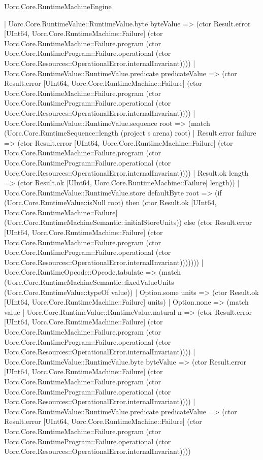 \begin{lexlean}{Uorc.Core.RuntimeMachineEngine}
\begin{semanticmodule}
{              | Uorc.Core.RuntimeValue::RuntimeValue.byte byteValue => (ctor Result.error [UInt64, Uorc.Core.RuntimeMachine::Failure] (ctor Uorc.Core.RuntimeMachine::Failure.program (ctor Uorc.Core.RuntimeProgram::Failure.operational (ctor Uorc.Core.Resources::OperationalError.internalInvariant))))
              | Uorc.Core.RuntimeValue::RuntimeValue.predicate predicateValue => (ctor Result.error [UInt64, Uorc.Core.RuntimeMachine::Failure] (ctor Uorc.Core.RuntimeMachine::Failure.program (ctor Uorc.Core.RuntimeProgram::Failure.operational (ctor Uorc.Core.Resources::OperationalError.internalInvariant))))
              | Uorc.Core.RuntimeValue::RuntimeValue.sequence root => (match (Uorc.Core.RuntimeSequence::length (project s arena) root)
                | Result.error failure => (ctor Result.error [UInt64, Uorc.Core.RuntimeMachine::Failure] (ctor Uorc.Core.RuntimeMachine::Failure.program (ctor Uorc.Core.RuntimeProgram::Failure.operational (ctor Uorc.Core.Resources::OperationalError.internalInvariant))))
                | Result.ok length => (ctor Result.ok [UInt64, Uorc.Core.RuntimeMachine::Failure] length))
              | Uorc.Core.RuntimeValue::RuntimeValue.store defaultByte root => (if (Uorc.Core.RuntimeValue::isNull root) then (ctor Result.ok [UInt64, Uorc.Core.RuntimeMachine::Failure] (Uorc.Core.RuntimeMachineSemantic::initialStoreUnits)) else (ctor Result.error [UInt64, Uorc.Core.RuntimeMachine::Failure] (ctor Uorc.Core.RuntimeMachine::Failure.program (ctor Uorc.Core.RuntimeProgram::Failure.operational (ctor Uorc.Core.Resources::OperationalError.internalInvariant)))))))
          | Uorc.Core.RuntimeOpcode::Opcode.tabulate => (match (Uorc.Core.RuntimeMachineSemantic::fixedValueUnits (Uorc.Core.RuntimeValue::typeOf value))
            | Option.some units => (ctor Result.ok [UInt64, Uorc.Core.RuntimeMachine::Failure] units)
            | Option.none => (match value
              | Uorc.Core.RuntimeValue::RuntimeValue.natural n => (ctor Result.error [UInt64, Uorc.Core.RuntimeMachine::Failure] (ctor Uorc.Core.RuntimeMachine::Failure.program (ctor Uorc.Core.RuntimeProgram::Failure.operational (ctor Uorc.Core.Resources::OperationalError.internalInvariant))))
              | Uorc.Core.RuntimeValue::RuntimeValue.byte byteValue => (ctor Result.error [UInt64, Uorc.Core.RuntimeMachine::Failure] (ctor Uorc.Core.RuntimeMachine::Failure.program (ctor Uorc.Core.RuntimeProgram::Failure.operational (ctor Uorc.Core.Resources::OperationalError.internalInvariant))))
              | Uorc.Core.RuntimeValue::RuntimeValue.predicate predicateValue => (ctor Result.error [UInt64, Uorc.Core.RuntimeMachine::Failure] (ctor Uorc.Core.RuntimeMachine::Failure.program (ctor Uorc.Core.RuntimeProgram::Failure.operational (ctor Uorc.Core.Resources::OperationalError.internalInvariant))))
}
\end{semanticmodule}
\end{lexlean}
